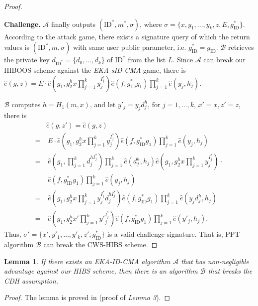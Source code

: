 \documentclass[times]{secauth}
\newtheorem{lemma}[theorem]{Lemma}
\theoremstyle{definition}
\theoremstyle{remark}
\begin{document}
\begin{proof}
\begin{itemize}
\end{itemize}
\textbf{Challenge.} 
$\mathcal{A}$ finally outputs $(\mathrm{ID}^*, m^*, \sigma)$, where $ \sigma=\{x, y_1, \ldots, y_k, z, E, g_{\mathrm{ID}}^*\}$. 
According to the attack game, there exists a signature query of which the return values is $(\mathrm{ID^*}, m, \sigma)$ with same user public parameter, i.e. $g_{\mathrm{ID}}^* = g_{\mathrm{ID}}$. 
$\mathcal{B}$ retrieves the private key $d_{\mathrm{ID}^*}=\{d_0, \ldots, d_k\}$ of $\mathrm{ID}^*$ from the list $L$.
Since $\mathcal{A}$ can break our HIBOOS scheme against the \emph{EKA-sID-CMA} game, 
there is $\hat{e}(g, z) = E \cdot \hat{e}(g_1, g_2^hx\prod_{j=1}^k y^{I^*_j}_j)\hat{e}(f, g_\mathrm{ID}^*g_1)\prod_{j=1}^k \hat{e}(y_j, h_j)$.
\par
$\mathcal{B}$ computes $h = H_1(m, x)$, and let $y'_j=y_jd_j^h$, for $j=1, \ldots, k$, $x'=x, z' = z$, there is 
\begin{align*}
&\hat{e}(g, z') =\hat{e}(g, z)\\
=&~E \cdot \hat{e}(g_1, g_2^hx\prod_{j=1}^k y^{I^*_j}_j)\hat{e}(f, g_\mathrm{ID}^*g_1)\prod_{j=1}^k \hat{e}(y_j, h_j)\\
=&~\hat{e}(g_1, \prod_{j=1}^{k} d_j^{hI^*_j})\prod_{j=1}^{k} \hat{e}(d_j^h, h_j)\hat{e}(g_1, g_2^hx\prod_{j=1}^k y^{I^*_j}_j) \cdot\\ 
&~\hat{e}(f, g_\mathrm{ID}^*g_1)\prod_{j=1}^k \hat{e}(y_j, h_j)\\
=&~\hat{e}(g_1, g_2^hx\prod_{j=1}^k y^{I^*_j}_jd_j^{hI^*_j})\hat{e}(f, g_\mathrm{ID}^*g_1)\prod_{j=1}^k \hat{e}(y_jd_j^h, h_j)\\
=&~\hat{e}(g_1, g_2^hx'\prod_{j=1}^k {y'}_j^{I^*_j})\hat{e}(f, g_\mathrm{ID}^*g_1)\prod_{j=1}^k \hat{e}(y'_j, h_j).
\end{align*}
Thus, $\sigma'=\{x', y'_1, \ldots, y'_k, z', g_{\mathrm{ID}}^*\}$ is a valid challenge signature. 
That is, PPT algorithm $\mathcal{B}$ can break the CWS-HIBS scheme.
\end{proof}

\begin{lemma} \label{lemma-eps-hibs}
If there exists an EKA-ID-CMA algorithm $\mathcal{A}$ that has non-negligible advantage against our HIBS scheme, 
then there is an algorithm $\mathcal{B}$ that breaks the CDH assumption.
\end{lemma}
\begin{proof}
The lemma is proved  in \cite{anescrowfree2015chen} (proof of \emph{Lemma 3}).
\end{proof}
\end{document}
